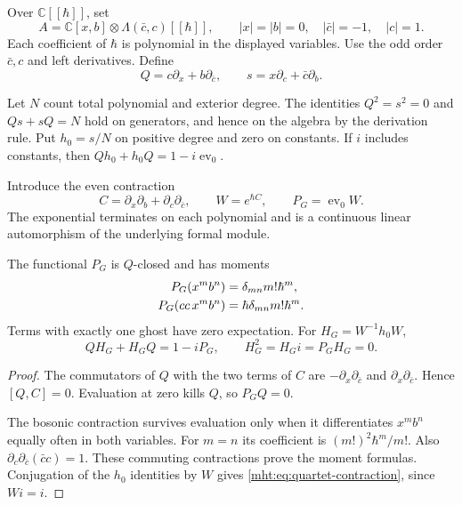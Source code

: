 Over $\mathbb C[[\hbar]]$, set
\[
 A=\mathbb C[x,b]\otimes\Lambda(\bar c,c)[[\hbar]],
 \qquad |x|=|b|=0,\quad |\bar c|=-1,\quad |c|=1.
\]
Each coefficient of $\hbar$ is polynomial in the displayed
variables. Use the odd order $\bar c,c$ and left derivatives.
Define
\[
 Q=c\partial_x+b\partial_{\bar c},\qquad
 s=x\partial_c+\bar c\partial_b.
\]

Let $N$ count total polynomial and exterior degree.
The identities $Q^2=s^2=0$ and $Qs+sQ=N$ hold on generators,
and hence on the algebra by the derivation rule.
Put $h_0=s/N$ on positive degree and zero on constants.
If $i$ includes constants, then
$Qh_0+h_0Q=1-i\operatorname{ev}_0$.

Introduce the even contraction
\begin{equation}\label{mht:eq:quartet-wick}
 C=\partial_x\partial_b+\partial_c\partial_{\bar c},
 \qquad W=e^{\hbar C},\qquad P_G=\operatorname{ev}_0W.
\end{equation}
The exponential terminates on each polynomial and is a
continuous linear automorphism of the underlying formal module.

\begin{theorem}\label{mht:thm:quartet-preparation}
The functional $P_G$ is $Q$-closed and has moments
\begin{align}
 P_G(x^mb^n)&=\delta_{mn}m!\hbar^m,\notag\\
 P_G(\bar c c\,x^mb^n)&=\hbar\delta_{mn}m!\hbar^m.
       \label{mht:eq:quartet-moments}
\end{align}
Terms with exactly one ghost have zero expectation.
For $H_G=W^{-1}h_0W$,
\begin{equation}\label{mht:eq:quartet-contraction}
 QH_G+H_GQ=1-iP_G,
 \qquad H_G^2=H_Gi=P_GH_G=0.
\end{equation}
\end{theorem}

\begin{proof}
The commutators of $Q$ with the two terms of $C$ are
$-\partial_x\partial_{\bar c}$ and
$\partial_x\partial_{\bar c}$. Hence $[Q,C]=0$.
Evaluation at zero kills $Q$, so $P_GQ=0$.

The bosonic contraction survives evaluation only when it
differentiates $x^mb^n$ equally often in both variables.
For $m=n$ its coefficient is $(m!)^2\hbar^m/m!$.
Also $\partial_c\partial_{\bar c}(\bar c c)=1$.
These commuting contractions prove the moment formulas.
Conjugation of the $h_0$ identities by $W$ gives
\eqref{mht:eq:quartet-contraction}, since $Wi=i$.
\end{proof}


